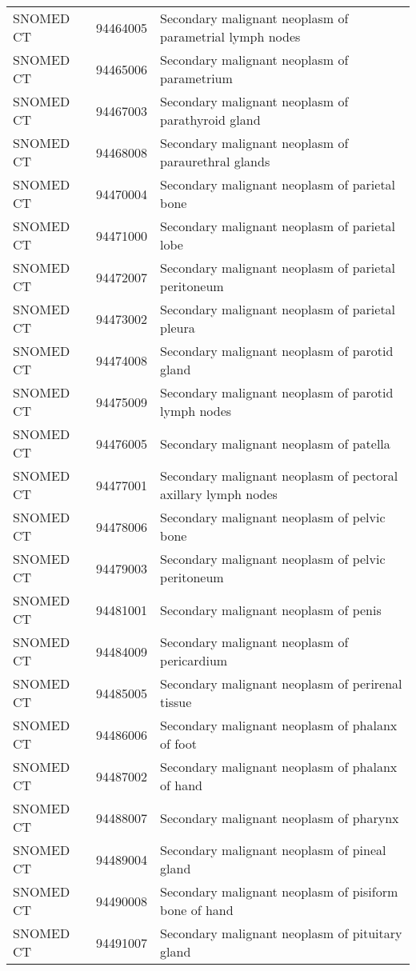 \begin{longtable}{p{}p{}p{}}
  SNOMED CT & 94464005 & Secondary malignant neoplasm of parametrial lymph nodes \\ 
  SNOMED CT & 94465006 & Secondary malignant neoplasm of parametrium \\ 
  SNOMED CT & 94467003 & Secondary malignant neoplasm of parathyroid gland \\ 
  SNOMED CT & 94468008 & Secondary malignant neoplasm of paraurethral glands \\ 
  SNOMED CT & 94470004 & Secondary malignant neoplasm of parietal bone \\ 
  SNOMED CT & 94471000 & Secondary malignant neoplasm of parietal lobe \\ 
  SNOMED CT & 94472007 & Secondary malignant neoplasm of parietal peritoneum \\ 
  SNOMED CT & 94473002 & Secondary malignant neoplasm of parietal pleura \\ 
  SNOMED CT & 94474008 & Secondary malignant neoplasm of parotid gland \\ 
  SNOMED CT & 94475009 & Secondary malignant neoplasm of parotid lymph nodes \\ 
  SNOMED CT & 94476005 & Secondary malignant neoplasm of patella \\ 
  SNOMED CT & 94477001 & Secondary malignant neoplasm of pectoral axillary lymph nodes \\ 
  SNOMED CT & 94478006 & Secondary malignant neoplasm of pelvic bone \\ 
  SNOMED CT & 94479003 & Secondary malignant neoplasm of pelvic peritoneum \\ 
  SNOMED CT & 94481001 & Secondary malignant neoplasm of penis \\ 
  SNOMED CT & 94484009 & Secondary malignant neoplasm of pericardium \\ 
  SNOMED CT & 94485005 & Secondary malignant neoplasm of perirenal tissue \\ 
  SNOMED CT & 94486006 & Secondary malignant neoplasm of phalanx of foot \\ 
  SNOMED CT & 94487002 & Secondary malignant neoplasm of phalanx of hand \\ 
  SNOMED CT & 94488007 & Secondary malignant neoplasm of pharynx \\ 
  SNOMED CT & 94489004 & Secondary malignant neoplasm of pineal gland \\ 
  SNOMED CT & 94490008 & Secondary malignant neoplasm of pisiform bone of hand \\ 
  SNOMED CT & 94491007 & Secondary malignant neoplasm of pituitary gland \\ 

\end{longtable}
